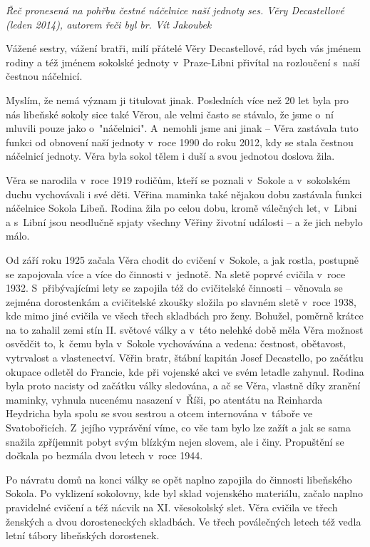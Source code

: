 \documentclass[a5paper, 11pt, twoside]{article}
\begin{document}
\textit{Řeč pronesená na pohřbu čestné náčelnice naší jednoty ses. Věry
Decastellové (leden 2014), autorem řeči byl br. Vít Jakoubek}

Vážené sestry, vážení bratři, milí přátelé Věry Decastellové, rád bych
vás jménem rodiny a též jménem sokolské jednoty v~Praze-Libni přivítal
na rozloučení s~naší čestnou náčelnicí.

Myslím, že nemá význam ji titulovat jinak. Posledních více než 20 let
byla pro nás libeňské sokoly sice také Věrou, ale velmi často se
stávalo, že jsme o~ní mluvili pouze jako o~"náčelnici". A~nemohli jsme
ani jinak -- Věra zastávala tuto funkci od obnovení naší jednoty v~roce
1990 do roku 2012, kdy se stala čestnou náčelnicí jednoty. Věra byla
sokol tělem i duší a svou jednotou doslova žila.

Věra se narodila v~roce 1919 rodičům, kteří se poznali v~Sokole a
v~sokolském duchu vychovávali i své děti. Věřina maminka také nějakou dobu
zastávala funkci náčelnice Sokola Libeň. Rodina žila po celou dobu,
kromě válečných let, v~Libni a s~Libní jsou neodlučně spjaty všechny
Věřiny životní události -- a že jich nebylo málo.

Od září roku 1925 začala Věra chodit do cvičení v~Sokole, a jak rostla,
postupně se zapojovala více a více do činnosti v~jednotě. Na sletě
poprvé cvičila v~roce 1932. S~přibývajícími lety se zapojila též do
cvičitelské činnosti -- věnovala se zejména dorostenkám a cvičitelské
zkoušky složila po slavném sletě v~roce 1938, kde mimo jiné cvičila ve
všech třech skladbách pro ženy. Bohužel, poměrně krátce na to zahalil
zemi stín II. světové války a v~této nelehké době měla Věra možnost
osvědčit to, k~čemu byla v~Sokole vychovávána a vedena: čestnost,
obětavost, vytrvalost a vlastenectví. Věřin bratr, štábní kapitán Josef
Decastello, po začátku okupace odletěl do Francie, kde při vojenské akci
ve svém letadle zahynul. Rodina byla proto nacisty od začátku války
sledována, a ač se Věra, vlastně díky zranění maminky, vyhnula nucenému
nasazení v~Říši, po atentátu na Reinharda Heydricha byla spolu se svou
sestrou a otcem internována v~táboře ve Svatobořicích. Z~jejího
vyprávění víme, co vše tam bylo lze zažít a jak se sama snažila
zpříjemnit pobyt svým blízkým nejen slovem, ale i činy. Propuštění se
dočkala po bezmála dvou letech v~roce 1944.

Po návratu domů na konci války se opět naplno zapojila do činnosti
libeňského Sokola. Po vyklizení sokolovny, kde byl sklad vojenského
materiálu, začalo naplno pravidelné cvičení a též nácvik na XI.
všesokolský slet. Věra cvičila ve třech ženských a dvou dorosteneckých
skladbách. Ve třech poválečných letech též vedla letní tábory libeňských
dorostenek.
\end{document}
